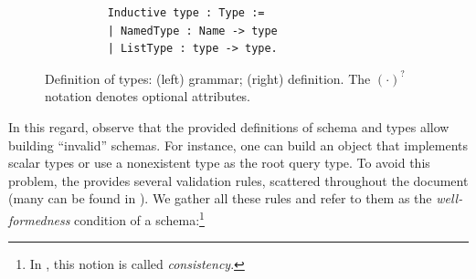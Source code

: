 \begin{figure}[h]
\begin{subfigure}{.5\textwidth}
\begin{verbatim}
    Inductive type : Type :=
    | NamedType : Name -> type
    | ListType : type -> type.
    \end{verbatim}

    \end{subfigure}
    \caption{Definition of \gql types: (left) \spec grammar; 
    (right) \gcoql definition.\newline
    {\footnotesize The $(\cdot)^{?}$ notation denotes optional attributes.} 
    }
    \label{fig:types_def}
\end{figure}






In this regard, observe that the provided definitions of schema and
types allow building ``invalid'' schemas. For instance, one can build
an object that implements scalar types or use a nonexistent type as
the root query type. To avoid this problem, the \spec provides several
validation rules, scattered throughout the document (many can be found
\eg in \cite[\S3]{gqlspec}
). 
 We gather all these rules and refer to them as the \textit{well-formedness}
condition of a \gql schema:\footnote{In \HP, this notion is called {\em consistency}.}

